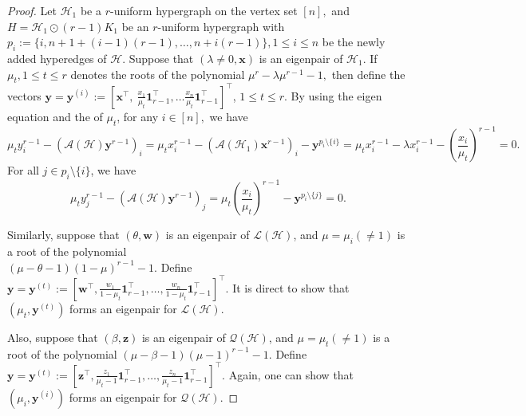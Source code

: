 \documentclass[10pt,a4paper]{article}
\begin{document}
	\begin{proof}
		Let $\mathcal{H}_1$ be a $r$-uniform hypergraph on  the vertex set $[n],$ and $H = \mathcal{H}_1 \odot (r-1) K_1$ be an $r$-uniform hypergraph with $p_i :=\{ i, n+1+(i-1)(r-1), \ldots, n+i(r-1) \}, 1 \leq i \leq n$ be the newly added hyperedges of $\mathcal{H}$.
		Suppose that $(\lambda \neq 0, \mathbf{x})$ is an eigenpair of $\mathcal{H}_1.$ 
		If $\mu_t, 1 \leq t \leq r$ denotes the roots of the polynomial $\mu^r-\lambda \mu^{r-1} -1,$ then define the vectors $\mathbf{y}=\mathbf{y}^{(i)} := [\mathbf{x}^\intercal, \ \frac{x_1}{\mu_t}\mathbf{1}_{r-1}^\intercal, \ldots  \frac{x_n}{\mu_t}\mathbf{1}_{r-1}^\intercal]^\intercal$,  $ 1 \leq t \leq r.$
		By using the eigen equation and the  of $\mu_t$, for any $i \in [n],$ we have
		\begin{equation*}
			\mu_t{y}_i^{r-1} -  (\mathcal{A}(\mathcal{H})\mathbf{y}^{r-1})_i = \mu_t{x}_i^{r-1} - (\mathcal{A}(\mathcal{H}_1)\mathbf{x}^{r-1})_i - \mathbf{y}^{p_i \setminus \{i\}} = \mu_t{x}_i^{r-1}-\lambda x_i^{r-1} - \left(\frac{x_i}{\mu_t}\right)^{r-1}=0.
		\end{equation*}
		For all $j \in p_i \setminus \{i\}$, we have 
		\begin{equation*}
			\mu_t y_j^{r-1}-(\mathcal{A}(\mathcal{H})\mathbf{y}^{r-1})_j =\mu_t \left(\frac{x_i}{\mu_t} \right)^{r-1} - \mathbf{y}^{p_i \setminus\{ j \} } = 0.
		\end{equation*}
		
		Similarly, suppose that $(\theta, \mathbf{w})$ is an eigenpair of $\mathcal{L}(\mathcal{H})$, and $\mu = \mu_i ( \neq 1 )$ is a root of the  polynomial  \\ $\left( \mu-\theta-1 \right)\left( 1-\mu \right)^{r-1}-1$. 
		Define $\mathbf{y}=\mathbf{y}^{(t)} := \left[ \mathbf{w}^\intercal, \frac{w_1}{1-\mu_t}\mathbf{1}_{r-1}^{\intercal}, \ldots , \frac{w_n}{1-\mu_t }\mathbf{1}_{r-1}^{\intercal} \right]^\intercal$.
		It is direct to show that $(\mu_t, \mathbf{y}^{(t)})$ forms an eigenpair for $\mathcal{L}(\mathcal{H})$.
		
		Also, suppose that $(\beta, \mathbf{z})$ is an eigenpair of $\mathcal{Q}(\mathcal{H})$, and $\mu = \mu_t ( \neq 1 )$ is a root of the 
		polynomial  $\left( \mu-\beta-1 \right)\left( \mu-1 \right)^{r-1}-1$. 
		Define $\mathbf{y}=\mathbf{y}^{(t)} := \left[ \mathbf{z}^\intercal, \frac{z_1}{\mu_t-1}\mathbf{1}_{r-1}^{\intercal}, \ldots , \frac{z_n}{\mu_t-1 }\mathbf{1}_{r-1}^{\intercal} \right]^\intercal$.
		Again, one can show that $(\mu_i, \mathbf{y}^{(i)})$ forms an eigenpair for $\mathcal{Q}(\mathcal{H})$.
	\end{proof}
	
\end{document}
